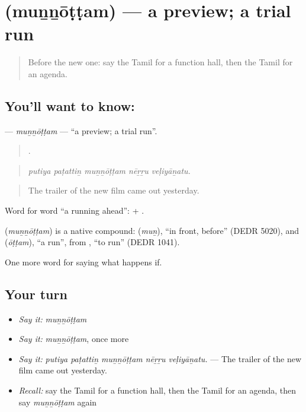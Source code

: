 \section[\texorpdfstring{\ta{முன்னோட்டம்} (muṉṉōṭṭam)}{முன்னோட்டம் (muṉṉōṭṭam)}]{ (muṉṉōṭṭam) — a preview; a trial run}

\label{lesson:TA-C549-munnottam}



\begin{quote}
Before the new one: say the Tamil for a function hall, then the Tamil for an agenda.
\end{quote}

\subsection*{You'll want to know: }
\textbf{} — \emph{muṉṉōṭṭam} — \textquotedblleft{}a preview; a trial run\textquotedblright{}.

\begin{quote}
    .
\end{quote}

\begin{quote}
\emph{putiya paṭattiṉ muṉṉōṭṭam nēṟṟu veḷiyāṉatu.}
\end{quote}

\begin{quote}
The trailer of the new film came out yesterday.
\end{quote}

Word for word \textquotedblleft{}a running ahead\textquotedblright{}:  + .

\begin{cousinweb}
\textbf{} (\emph{muṉṉōṭṭam}) is a native compound:  (\emph{muṉ}), \textquotedblleft{}in front, before\textquotedblright{} (DEDR 5020), and  (\emph{ōṭṭam}), \textquotedblleft{}a run\textquotedblright{}, from , \textquotedblleft{}to run\textquotedblright{} (DEDR 1041).
\end{cousinweb}

\begin{grammarlens}[title={What you've built}]
One more word for saying what happens if.
\end{grammarlens}

\subsection*{Your turn}
\begin{itemize}
\raggedright
  \item \emph{Say it:} \emph{muṉṉōṭṭam}
  \item \emph{Say it:} \emph{muṉṉōṭṭam}, once more
  \item \emph{Say it:} \emph{putiya paṭattiṉ muṉṉōṭṭam nēṟṟu veḷiyāṉatu.} — The trailer of the new film came out yesterday.
  \item \emph{Recall:} say the Tamil for a function hall, then the Tamil for an agenda, then say \emph{muṉṉōṭṭam} again
\end{itemize}

